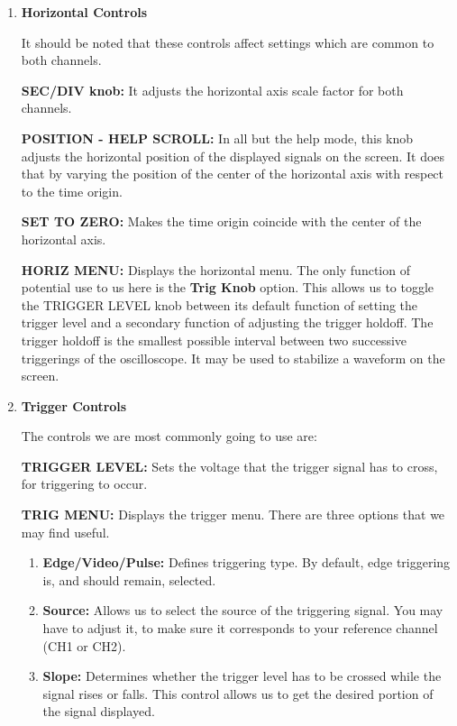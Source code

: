 \begin{enumerate}
\begin{enumerate}
\end{enumerate}

\item {\bf Horizontal Controls}

It should be noted that these controls affect settings which are common to both
channels.

{\bf SEC/DIV knob:} It adjusts the horizontal axis scale factor for both
channels.

{\bf POSITION - HELP SCROLL:} In all but the help mode, this knob adjusts the
horizontal position of the displayed signals on the screen. It does that by
varying the position of the center of the horizontal axis with respect to the
time origin.

{\bf SET TO ZERO:} Makes the time origin coincide with the center of the
horizontal axis.

{\bf HORIZ MENU:} Displays the horizontal menu. The only function of potential
use to us here is the {\bf Trig Knob} option. This allows us to toggle the
TRIGGER LEVEL knob between its default function of setting the trigger level and
a secondary function of adjusting the trigger holdoff. The trigger holdoff is the
smallest possible interval between two successive triggerings of the oscilloscope.
It may be used to stabilize a waveform on the screen.

\item {\bf Trigger Controls}

The controls we are most commonly going to use are:

{\bf TRIGGER LEVEL:} Sets the voltage that the trigger signal has to cross, for
triggering to occur.

{\bf TRIG MENU:} Displays the trigger menu. There are three options that we may
find useful.

\begin{enumerate}

\item {\bf Edge/Video/Pulse:} Defines triggering type. By default, edge triggering
is, and should remain, selected.

\item {\bf Source:} Allows us to select the source of the triggering signal. You
may have to adjust it, to make sure it corresponds to your reference channel
(CH1 or CH2).

\item {\bf Slope:} Determines whether the trigger level has to be crossed while
the signal rises or falls. This control allows us to get the desired portion of
the signal displayed.


\end{enumerate}
\end{enumerate}
